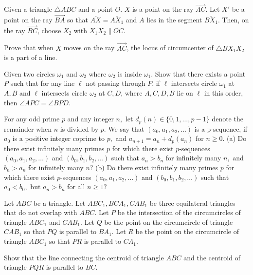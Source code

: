 \documentclass[11pt]{scrartcl}
\begin{document}
\begin{problem}[1790114062253914451]
	Given a triangle $ \triangle{ABC} $ and a point $ O $. $ X $ is a point on the ray $ \overrightarrow{AC} $. Let $ X' $ be a point on the ray $ \overrightarrow{BA} $ so that $ \overline{AX} = \overline{AX_{1}} $ and $ A $ lies in the segment $ \overline{BX_{1}} $. Then, on the ray $ \overrightarrow{BC} $, choose $ X_{2} $ with $ \overline{X_{1}X_{2}} \parallel \overline{OC} $.

Prove that when $ X $ moves on the ray $ \overrightarrow{AC} $, the locus of circumcenter of $ \triangle{BX_{1}X_{2}} $ is a part of a line.
\end{problem}
\begin{problem}[7268978143074030034]
Given two circles $\omega_1$ and $\omega_2$ where $\omega_2$ is inside $\omega_1$. Show that there exists a point $P$ such that for any line $\ell$ not passing through $P$, if $\ell$ intersects circle $\omega_1$ at $A,B$ and $\ell$ intersects circle $\omega_2$ at $C,D$, where $A,C,D,B$ lie on $\ell$ in this order, then $\angle APC=\angle BPD$.
\end{problem}
\begin{problem}[522990139281725]
	For any odd prime $p$ and any integer $n,$ let $d_p (n) \in \{ 0,1, \dots, p-1 \}$ denote the remainder when $n$ is divided by $p.$ We say that $(a_0, a_1, a_2, \dots)$ is a p-sequence, if $a_0$ is a positive integer coprime to $p,$ and $a_{n+1} =a_n + d_p (a_n)$ for $n \geqslant 0.$
(a) Do there exist infinitely many primes $p$ for which there exist $p$-sequences $(a_0, a_1, a_2, \dots)$ and $(b_0, b_1, b_2, \dots)$ such that $a_n >b_n$ for infinitely many $n,$ and $b_n > a_n$ for infinitely many $n?$
(b) Do there exist infinitely many primes $p$ for which there exist $p$-sequences $(a_0, a_1, a_2, \dots)$ and $(b_0, b_1, b_2, \dots)$ such that $a_0 <b_0,$ but $a_n >b_n$ for all $n \geqslant 1?$
\end{problem}
\begin{problem}[748616641641895]
Let $ABC$ be a triangle. Let $ABC_1, BCA_1, CAB_1$ be three equilateral triangles that do not overlap with $ABC$.
Let $P$ be the intersection of the circumcircles of triangle $ABC_1$ and $CAB_1$.
Let $Q$ be the point on the circumcircle of triangle $CAB_1$ so that $PQ$ is parallel to $BA_1$. Let $R$ be the point on the circumcircle of triangle $ABC_1$ so that $PR$ is parallel to $CA_1$.

Show that the line connecting the centroid of triangle $ABC$ and the centroid of triangle $PQR$ is parallel to $BC$.
\end{problem}
\end{document}
